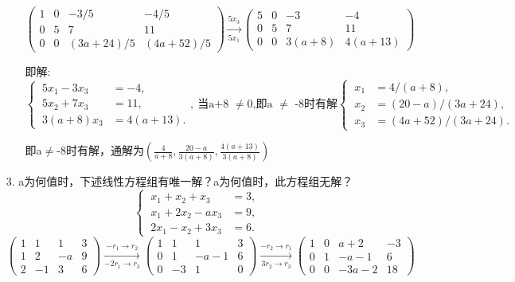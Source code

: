 \documentclass{article}
\begin{document}
\begin{enumerate}
\begin{enumerate}
            $
                \begin{pmatrix}
                    1& 0& -3/5& -4/5\\
                    0& 5& 7& 11\\
                    0& 0& (3a+24)/5& (4a+52)/5
                \end{pmatrix}
                \xrightarrow[5x_1]{5x_3}
                \begin{pmatrix}
                    5& 0& -3& -4\\
                    0& 5& 7& 11\\
                    0& 0& 3(a+8)& 4(a+13)
                \end{pmatrix}
            $

            即解:
            \[
                \begin{cases}
                    \ 5x_1-3x_3&=-4,\\
                    \ 5x_2+7x_3&=11,\\
                    \ 3(a+8)x_3&=4(a+13).
                \end{cases}
            ,\ \mbox{当a+8 $\neq $0,即a $\neq$ -8时有解}
                \begin{cases}
                    \ x_1&=4/(a+8),\\
                    \ x_2&=(20-a)/(3a+24),\\
                    \ x_3&=(4a+52)/(3a+24).
                \end{cases}
            \]

            即a$\neq $-8时有解，通解为$\displaystyle{\left(\frac{4}{a+8} ,\frac{20-a}{3(a+8)} ,\frac{4(a+13)}{3(a+8)}\right)}$
        \end{enumerate}
        \item [3.]a为何值时，下述线性方程组有唯一解？a为何值时，此方程组无解？
        \[
        \begin{cases}
            \ x_1 +x_2 +x_3&=3,\\
            \ x_1 +2x_2 -ax_3&=9,\\
            \ 2x_1 -x_2 +3x_3&=6.
        \end{cases}
        \]
        $
        \begin{pmatrix}
            1& 1& 1& 3\\
            1& 2& -a& 9\\
            2& -1& 3& 6
        \end{pmatrix}
        \xrightarrow[-2r_1 \rightarrow r_3]{-r_1 \rightarrow r_2}
        \begin{pmatrix}
            1& 1& 1& 3\\
            0& 1& -a-1& 6\\
            0& -3& 1& 0
        \end{pmatrix}
        \xrightarrow[3r_2 \rightarrow r_3]{-r_2 \rightarrow r_1}
        \begin{pmatrix}
            1& 0& a+2& -3\\
            0& 1& -a-1& 6\\
            0& 0& -3a-2& 18
        \end{pmatrix}
        $


\end{enumerate}
\end{document}
